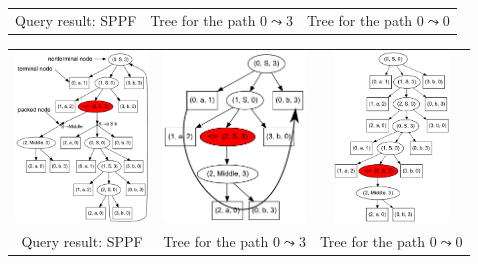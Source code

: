 \documentclass[xcolor=table]{beamer}
\begin{document}
\begin{frame}
\begin{overprint}
\begin{tabular}{  c  c  c  }
\\
\small{Query result: SPPF}
& \small{Tree for the path $0 \leadsto 3$}
& \small{Tree for the path $0 \leadsto 0$}
\end{tabular}
\begin{tabular}{  c  c  c  }
    \includegraphics[height=4.5cm]{pictures/AnBn.pdf}
    &
    \includegraphics[height=4.5cm]{pictures/AnBn_2_m.pdf}

    &
    \includegraphics[height=4.5cm]{pictures/AnBn_1.pdf}

\\
\small{Query result: SPPF}
& \small{Tree for the path $0 \leadsto 3$}
& \small{Tree for the path $0 \leadsto 0$}

\end{tabular}
\end{overprint}

\end{frame}
\end{document}
